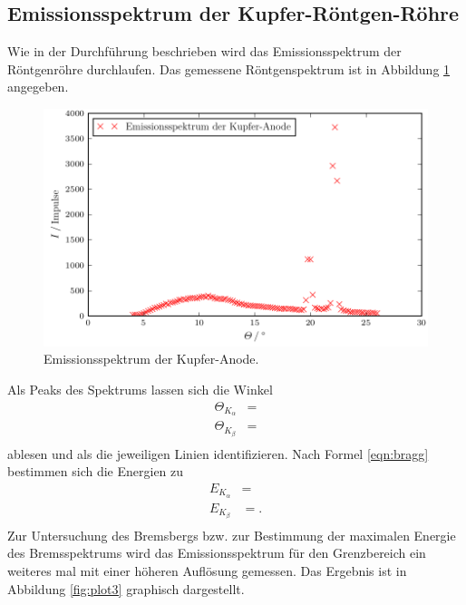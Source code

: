 \subsection{Emissionsspektrum der Kupfer-Röntgen-Röhre}
Wie in der Durchführung beschrieben wird das Emissionsspektrum der Röntgenröhre durchlaufen.
Das gemessene Röntgenspektrum ist in Abbildung \ref{fig:plot2} angegeben.
\begin{figure}
  \centering
  \includegraphics{build/plot_2.pdf}
  \caption{Emissionsspektrum der Kupfer-Anode.}
  \label{fig:plot2}
\end{figure}
Als Peaks des Spektrums lassen sich die Winkel
\begin{align*}
   \Theta_{K_\alpha} &=  \\
   \Theta_{K_\beta} &=  \\
\end{align*}
ablesen und als die jeweiligen Linien identifizieren.
Nach Formel \eqref{eqn:bragg} bestimmen sich die Energien zu
\begin{align*}
  E_{K_\alpha} &=  \\
  E_{K_\beta} &= . \\
\end{align*}
Zur Untersuchung des Bremsbergs bzw. zur Bestimmung der maximalen Energie des Bremsspektrums wird das Emissionsspektrum für den Grenzbereich ein weiteres mal mit einer höheren Auflösung gemessen.
Das Ergebnis ist in Abbildung \ref{fig:plot3} graphisch dargestellt.
